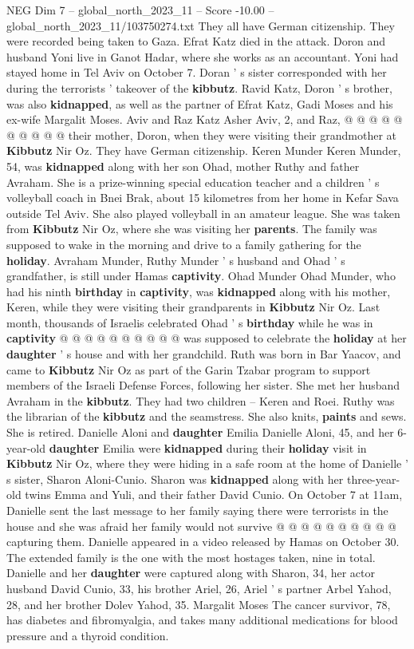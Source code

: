 \begin{textsample}{NEG Dim 7 – global\_north\_2023\_11 – Score -10.00 – global\_north\_2023\_11/103750274.txt}
They all have German citizenship.
They were recorded being taken to Gaza.
Efrat Katz died in the attack.
Doron and husband Yoni live in Ganot Hadar, where she works as an accountant.
Yoni had stayed home in Tel Aviv on October 7.
Doran ' s sister corresponded with her during the terrorists ' takeover of the \textbf{kibbutz}.
Ravid Katz, Doron ' s brother, was also \textbf{kidnapped}, as well as the partner of Efrat Katz, Gadi Moses and his ex-wife Margalit Moses.
Aviv and Raz Katz Asher Aviv, 2, and Raz, @ @ @ @ @ @ @ @ @ @ their mother, Doron, when they were visiting their grandmother at \textbf{Kibbutz} Nir Oz.
They have German citizenship.
Keren Munder Keren Munder, 54, was \textbf{kidnapped} along with her son Ohad, mother Ruthy and father Avraham.
She is a prize-winning special education teacher and a children ' s volleyball coach in Bnei Brak, about 15 kilometres from her home in Kefar Sava outside Tel Aviv.
She also played volleyball in an amateur league.
She was taken from \textbf{Kibbutz} Nir Oz, where she was visiting her \textbf{parents}.
The family was supposed to wake in the morning and drive to a family gathering for the \textbf{holiday}.
Avraham Munder, Ruthy Munder ' s husband and Ohad ' s grandfather, is still under Hamas \textbf{captivity}.
Ohad Munder Ohad Munder, who had his ninth \textbf{birthday} in \textbf{captivity}, was \textbf{kidnapped} along with his mother, Keren, while they were visiting their grandparents in \textbf{Kibbutz} Nir Oz.
Last month, thousands of Israelis celebrated Ohad ' s \textbf{birthday} while he was in \textbf{captivity} @ @ @ @ @ @ @ @ @ @ was supposed to celebrate the \textbf{holiday} at her \textbf{daughter} ' s house and with her grandchild.
Ruth was born in Bar Yaacov, and came to \textbf{Kibbutz} Nir Oz as part of the Garin Tzabar program to support members of the Israeli Defense Forces, following her sister.
She met her husband Avraham in the \textbf{kibbutz}.
They had two children -- Keren and Roei.
Ruthy was the librarian of the \textbf{kibbutz} and the seamstress.
She also knits, \textbf{paints} and sews.
She is retired.
Danielle Aloni and \textbf{daughter} Emilia Danielle Aloni, 45, and her 6-year-old \textbf{daughter} Emilia were \textbf{kidnapped} during their \textbf{holiday} visit in \textbf{Kibbutz} Nir Oz, where they were hiding in a safe room at the home of Danielle ' s sister, Sharon Aloni-Cunio.
Sharon was \textbf{kidnapped} along with her three-year-old twins Emma and Yuli, and their father David Cunio.
On October 7 at 11am, Danielle sent the last message to her family saying there were terrorists in the house and she was afraid her family would not survive @ @ @ @ @ @ @ @ @ @ capturing them.
Danielle appeared in a video released by Hamas on October 30.
The extended family is the one with the most hostages taken, nine in total.
Danielle and her \textbf{daughter} were captured along with Sharon, 34, her actor husband David Cunio, 33, his brother Ariel, 26, Ariel ' s partner Arbel Yahod, 28, and her brother Dolev Yahod, 35.
Margalit Moses The cancer survivor, 78, has diabetes and fibromyalgia, and takes many additional medications for blood pressure and a thyroid condition.


\end{textsample}
